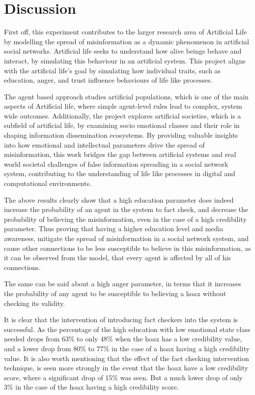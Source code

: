 \documentclass[twocolumn, a4paper, 12pt]{article}
\begin{document}
\section{Discussion}
First off, this experiment contributes to the larger research area of Artificial Life by modelling the spread of misinformation as a dynamic phenomenon in artificial social networks. Artificial life seeks to understand how alive beings behave and interact, by simulating this behaviour in an artificial system. This project aligns with the artificial life's goal by simulating how individual traits, such as education, anger, and trust influence behaviours of life like processes.

The agent based approach studies artificial populations, which is one of the main aspects of Artificial life, where simple agent-level rules lead to complex, system wide outcomes. Additionally, the project explores artificial societies, which is a subfield of artificial life, by examining socio emotional classes and their role in shaping information dissemination ecosystems. By providing valuable insights into how emotional and intellectual parameters drive the spread of misinformation, this work bridges the gap between artificial systems and real world societal challenges of false information spreading in a social network system, contributing to the understanding of life like processes in digital and computational environments.

The above results clearly show that a high education parameter does indeed increase the probability of an agent in the system to fact check, and decrease the probability of believing the misinformation, even in the case of a high credibility parameter. Thus proving that having a higher education level and media awareness, mitigate the spread of misinformation in a social network system, and cause other connections to be less susceptible to believe in this misinformation, as it can be observed from the model, that every agent is affected by all of his connections.

The same can be said about a high anger parameter, in terms that it increases the probability of any agent to be susceptible to believing a hoax without checking its validity.

It is clear that the intervention of introducing fact checkers into the system is successful. As the percentage of the high education with low emotional state class needed drops from 63\% to only 48\% when the hoax has a low credibility value, and a lower drop from 80\% to 77\% in the case of a hoax having a high credibility value. It is also worth mentioning that the effect of the fact checking intervention technique, is seen more strongly in the event that the hoax have a low credibility score, where a significant drop of 15\% was seen. But a much lower drop of only 3\% in the case of the hoax having a high credibility score.
\end{document}
